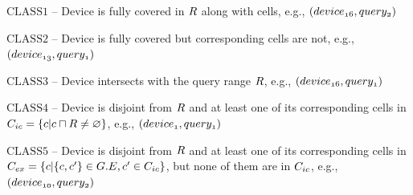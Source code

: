 \begin{frame}
\begin{columns}[c]
    \vspace{-20pt}
    \begin{itemize}
      \scriptsize{
      \item $\mathrm{CLASS1}$ -- \textrm{Device is fully covered in $\mathnormal{R}$ along with cells, e.g., $\mathnormal{(device_{16}, query_2)}$}
      \item $\mathrm{CLASS2}$ -- \textrm{Device is fully covered but corresponding cells are not,  e.g., $\mathnormal{(device_{13}, query_1)}$}
      \item $\mathrm{CLASS3}$ -- \textrm{Device intersects with the query range $\mathnormal{R}$,  e.g., $\mathnormal{(device_{16}, query_1)}$}
      \item $\mathrm{CLASS4}$ -- \textrm{Device is disjoint from $\mathnormal{R}$ and at least one of its corresponding cells in $\mathnormal{C_{ic} = \{ c|c \sqcap R \neq \varnothing \}}$,  e.g., $\mathnormal{(device_{1}, query_1)}$}
      \item $\mathrm{CLASS5}$ -- \textrm{Device is disjoint from $\mathnormal{R}$ and at least one of its corresponding cells in $\mathnormal{C_{ex} = \{ c| \{ c, c'\} \in G.E, c' \in C_{ic} \}}$, but none of them are in $\mathnormal{C_{ic}}$, e.g., $\mathnormal{(device_{10}, query_2)}$}
      }
    \end{itemize}

\end{columns}

\end{frame}


